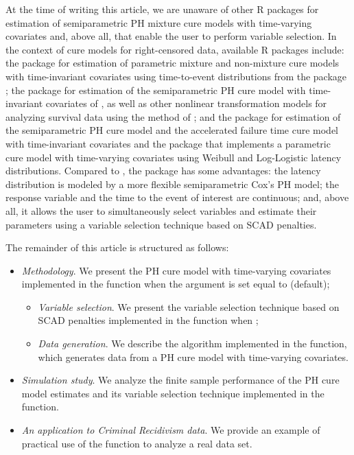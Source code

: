 At the time of writing this article, we are unaware of other R packages for estimation of semiparametric PH mixture cure models with time-varying covariates and, above all, that enable the user to perform variable selection. 
In the context of cure models for right-censored data, available R packages include: 
the  package \citep{flexsurvcure} for estimation of parametric mixture and non-mixture cure models with time-invariant covariates using time-to-event distributions from the  package \citep{flexsurv}; 
the  package \citep{nltm} for estimation of the semiparametric PH cure model with time-invariant covariates of \citet{Tsodikov_2003_cure}, as well as other nonlinear transformation models for analyzing survival data using the method of \citet{Tsodikov_2003_general}; 
and the  package \citep{smcure} for estimation of the semiparametric PH cure model and the accelerated failure time cure model with time-invariant covariates and the  package \citep{spduration} that implements a parametric cure model with time-varying covariates using Weibull and Log-Logistic latency distributions. 
Compared to , the  package has some advantages: the latency distribution is modeled by a more flexible semiparametric Cox's PH model; the response variable and the time to the event of interest are continuous; and, above all, it allows the user to simultaneously select variables and estimate their parameters using a variable selection technique based on SCAD penalties.


The remainder of this article is structured as follows: 
\begin{itemize}
	\item \textit{Methodology}. We present the PH cure model with time-varying covariates implemented in the  function when the argument  is set equal to  (default);
	\begin{itemize}
		\item \textit{Variable selection}. We present the variable selection technique based on SCAD penalties implemented in the  function when ;
		\item \textit{Data generation}. We describe the algorithm implemented in the  function, which generates data from a PH cure model with time-varying covariates.
	\end{itemize}
	\item \textit{Simulation study}. We analyze the finite sample performance of the PH cure model estimates and its variable selection technique implemented in the  function.
	\item \textit{An application to Criminal Recidivism data}. We provide an example of practical use of the  function to analyze a real data set.
\end{itemize}


